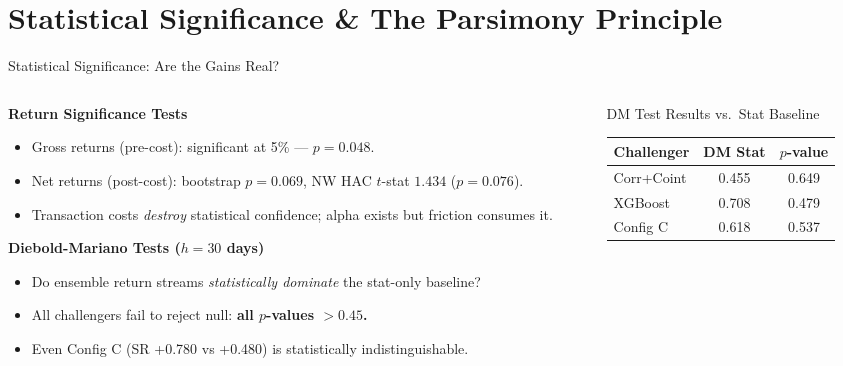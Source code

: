 \documentclass[aspectratio=169,10pt]{beamer}
\begin{document}
\section{Statistical Significance \& The Parsimony Principle}

\begin{frame}{Statistical Significance: Are the Gains Real?}
  \begin{columns}[T]
    \begin{column}{0.54\textwidth}
      \textbf{Return Significance Tests}
      \begin{itemize}\itemsep4pt
        \item Gross returns (pre-cost): significant at 5\% --- $p = 0.048$.
        \item Net returns (post-cost): bootstrap $p = 0.069$, NW HAC $t$-stat $1.434$ ($p = 0.076$).
        \item Transaction costs \emph{destroy} statistical confidence; alpha exists but friction consumes it.
      \end{itemize}
      \vspace{5pt}
      \textbf{Diebold-Mariano Tests ($h=30$ days)}
      \begin{itemize}\itemsep3pt
        \item Do ensemble return streams \emph{statistically dominate} the stat-only baseline?
        \item All challengers fail to reject null: \alert{\textbf{all $p$-values $> 0.45$.}}
        \item Even Config C (SR +0.780 vs +0.480) is statistically indistinguishable.
      \end{itemize}
    \end{column}
    \begin{column}{0.43\textwidth}
      \begin{block}{DM Test Results vs.\ Stat Baseline}
        \centering\scriptsize\renewcommand{\arraystretch}{1.3}
        \begin{tabular}{lcc}
          \toprule
          \textbf{Challenger} & \textbf{DM Stat} & \textbf{$p$-value} \\
          \midrule
          Corr+Coint  & 0.455 & 0.649 \\
          XGBoost     & 0.708 & 0.479 \\
          Config C    & 0.618 & 0.537 \\

\end{tabular}
\end{block}
\end{column}
\end{columns}
\end{frame}
\end{document}
